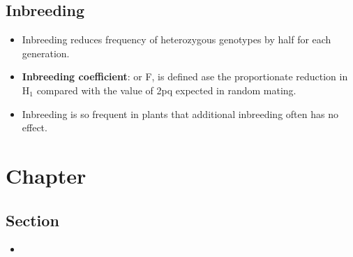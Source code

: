 \documentclass[12pt,a4paper]{article}
\begin{document}
\subsection{Inbreeding}
\begin{itemize}
    \item Inbreeding reduces frequency of heterozygous genotypes by half for each generation.
    \item \textbf{Inbreeding coefficient}: or F, is defined ase the proportionate reduction in H\(_{1}\) compared with the value of 2pq expected in random mating.
    \item Inbreeding is so frequent in plants that additional inbreeding often has no effect.
\end{itemize}

\clearpage
\section{Chapter}
\subsection{Section}
\begin{itemize}
    \item 
\end{itemize}
\end{document}
